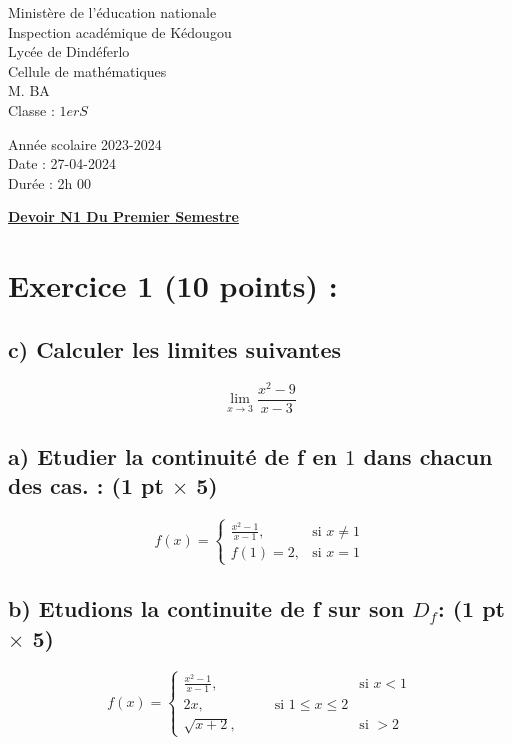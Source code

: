 \documentclass{article}
\begin{document}
\begin{minipage}{0.5\textwidth}
	Ministère de l'éducation nationale  \\
	Inspection académique de Kédougou   \\
	Lycée de Dindéferlo            \\
	Cellule de mathématiques            \\
	M. BA                          \\
	Classe : $1erS$  \\
\end{minipage}
\begin{minipage}{0.5\textwidth}
	Année scolaire 2023-2024 \\
	Date : 27-04-2024 \\
	Durée : 2h 00 \\
\end{minipage}

\begin{center}
	\textbf{{\underline{Devoir N1 Du Premier Semestre}}}
\end{center}

\section*{Exercice 1 (10 points) :}
\subsection*{c) Calculer les limites suivantes}
\[ \lim_{x \to 3}\frac{x^{2}-9}{x-3} \]

\subsection*{a) Etudier la continuité de f en $1$ dans chacun des cas. : (1 pt $\times$ 5)}
\[ f(x) = \begin{cases} 
  \frac{x^2-1}{x-1}, & \text{si } x \neq 1 \\
  f(1)=2, & \text{si } x = 1 
\end{cases} \]
\subsection*{b) Etudions la continuite de f sur son $D_{f}$: (1 pt $\times$ 5)}
\[ f(x) = \begin{cases} 
  \frac{x^2-1}{x-1}, & \text{si } x < 1 \\
   2x,\quad\quad\quad\quad\quad \text{si } 1 \leq x \leq 2\\
  \sqrt{x+2}, & \text{si } > 2
\end{cases} \]
\end{document}
